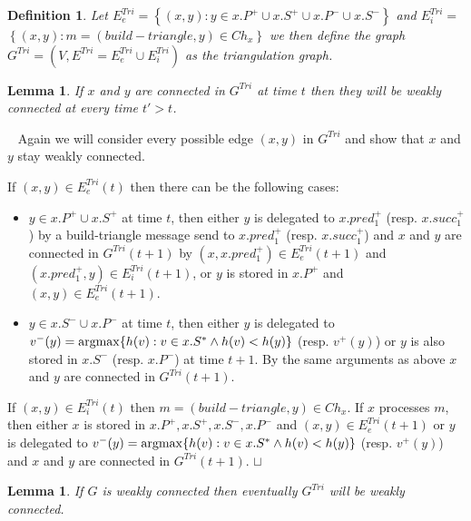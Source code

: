 \documentclass[11pt]{article}
\newtheorem{lemma}[theorem]{Lemma}
\newtheorem{definition}[theorem]{Definition}
\newcommand{\sq}{\hbox{\rlap{$\sqcap$}$\sqcup$}}
\newcommand{\qed}{\hspace*{\fill}\sq}
\newenvironment{proof}{\noindent {\bf Proof.}\ }{\qed\par\vskip 4mm\par}
\def\argmax{{\rm argmax}}
\begin{document}
\begin{definition}\label{def:TriangulationGraph}
Let $E^{Tri}_e=\left\{(x,y):y\in x.P^+ \cup x.S^+ \cup x.P^- \cup x.S^-\right\}$ and  $E^{Tri}_i=$ \newline $\left\{(x,y):  m=(build-triangle,y)\in Ch_x\right\} $ we then define the graph $G^{Tri}=\left(V,E^{Tri}=E^{Tri}_e \cup E^{Tri}_i\right)$ as the \emph{triangulation graph}.
\end{definition}

\begin{lemma} \label{lem:TriConnectivity}
If $x$ and $y$ are connected in $G^{Tri}$ at time $t$ then they will be weakly connected at every time $t'>t$.
\end{lemma}

\begin{proof}
Again we will consider every possible edge $(x,y)$ in $G^{Tri}$ and show that $x$ and $y$ stay weakly connected.

If $(x,y) \in E^{Tri}_e(t)$ then there can be the following cases:

\begin{itemize}
  \item $y \in x.P^+ \cup x.S^+$ at time $t$, then either $y$ is delegated to $x.pred^+_1$ (resp. $x.succ^+_1$) by a build-triangle message send to $x.pred^+_1$ (resp. $x.succ^+_1$) and $x$ and $y$ are connected in $G^{Tri}(t+1)$ by $(x,x.pred^+_1) \in E^{Tri}_e(t+1)$ and $(x.pred^+_1,y) \in E^{Tri}_i(t+1)$, or $y$ is stored in $x.P^+$ and $(x,y)\in E^{Tri}_e(t+1)$.
  \item $y \in x.S^- \cup x.P^-$ at time $t$, then either $y$ is delegated to $v^{-}(y)=\argmax \{h(v) : v \in x.S^* \wedge h(v)< h(y) \}$ (resp. $v^{+}(y)$) or $y$ is also stored in $x.S^-$ (resp. $x.P^-$) at time $t+1$. By the same arguments as above $x$ and $y$ are connected in $G^{Tri}(t+1)$.
\end{itemize}

If $(x,y) \in E^{Tri}_i(t)$ then $m=(build-triangle,y)\in Ch_x$. If $x$ processes $m$, then either $x$ is stored in $x.P^+, x.S^+, x.S^-,x.P^-$ and $(x,y)\in E^{Tri}_e(t+1)$ or $y$ is delegated to $v^{-}(y)=\argmax \{h(v): v \in x.S^* \wedge h(v)<h(y) \}$ (resp. $v^{+}(y)$) and $x$ and $y$ are connected in $G^{Tri}(t+1)$.
\end{proof}

\begin{lemma}\label{lem:TriConnectivity2}
If $G$ is weakly connected then eventually $G^{Tri}$ will be weakly connected.
\end{lemma}
\end{document}
